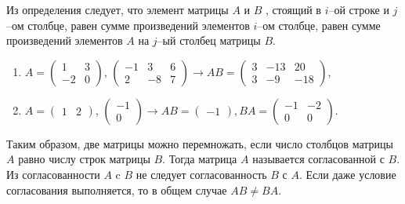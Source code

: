 Из определения следует, что элемент матрицы $A$ и $B$ , стоящий в $i$–ой строке и $j$–ом столбце, равен сумме произведений элементов $i$–ом столбце, равен сумме произведений элементов $A$ на $j$–ый столбец матрицы $B$.
\begin{example}
  \begin{enumerate} $\\$
    \item $A= \begin{pmatrix}
      1& 3\\
      -2& 0
    \end{pmatrix}$, $\begin{pmatrix}
      -1& 3& 6\\
      2& -8& 7
    \end{pmatrix} \rightarrow AB=\begin{pmatrix}
      3& -13& 20\\
      3& -9& -18
    \end{pmatrix}$,
    \item $A= \begin{pmatrix}
      1& 2
    \end{pmatrix}$, $\begin{pmatrix}
      -1\\
      0
    \end{pmatrix} \rightarrow AB=\begin{pmatrix}
      -1
    \end{pmatrix} , BA=\begin{pmatrix}
      -1& -2\\
      0& 0
    \end{pmatrix}$.
  \end{enumerate}
\end{example}
Таким образом, две матрицы можно перемножать, если число столбцов матрицы $A$ равно числу строк матрицы $B$. Тогда матрица $A$ называется согласованной с $B$. Из согласованности $A$ c $B$ не следует согласованность $B$ с $A$. Если даже условие согласования выполняется, то в общем случае $AB \neq BA$.
